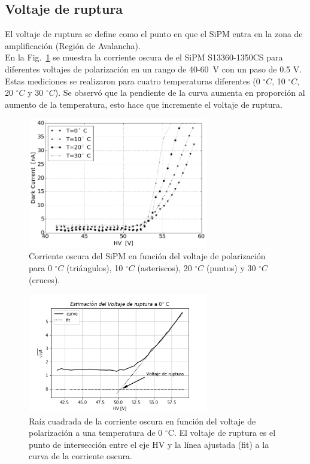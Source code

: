 \documentclass[runningheads]{llncs}
\begin{document}
\subsection{Voltaje de ruptura}
El voltaje de ruptura se define como el punto en que el SiPM entra en la zona de amplificación (Región de Avalancha).\\
En la Fig.~\ref{dark_current} se muestra la corriente oscura de el SiPM S13360-1350CS para diferentes voltajes de polarización en un rango de 40-60~V con un paso de 0.5 V. Estas mediciones se realizaron para cuatro temperaturas diferentes (0 $^\circ C$, 10 $^\circ C$, 20 $^\circ C$ y 30 $^\circ C$). Se observó que la pendiente de la curva aumenta en proporción al aumento de la temperatura, esto hace que incremente el voltaje de ruptura.  
\begin{figure}[ht!]
\includegraphics[width=0.7\textwidth]{SiPM_Temp.png}
\centering
\caption{Corriente oscura del SiPM en función del voltaje de polarización para 0 $^\circ C$ (triángulos), 10 $^\circ C$ (asteriscos), 20 $^\circ C$ (puntos) y 30 $^\circ C$ (cruces).} 
\label{dark_current}
\end{figure}

\begin{figure}[ht!]
\includegraphics[width=0.7\textwidth]{cal_voltaje_ruptura.png}
\centering
\caption{Raíz cuadrada de la corriente oscura en función del voltaje de polarización a una temperatura de 0 $^\circ$C. El voltaje de ruptura es el punto de intersección entre el eje HV y la línea ajustada (fit) a la curva de la corriente oscura.} 
\label{voltaje_de_ruptura}
\end{figure}
\end{document}
